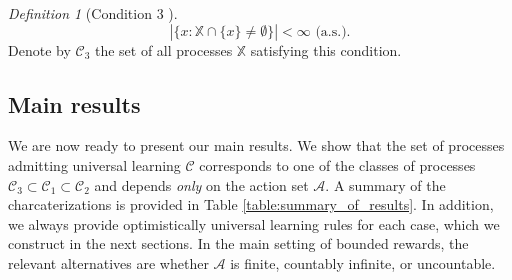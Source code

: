 \documentclass[aos]{imsart}
\theoremstyle{plain}
\theoremstyle{remark}
\newtheorem{definition}[theorem]{Definition}
\newcommand{\Acal}{\mathcal{A}}
\newcommand{\Ccal}{\mathcal{C}}
\newcommand{\1}{\mathbbm{1}}%
\newcommand{\ProcX}{\mathbb{X}}
\newcommand{\UKC}{\mathcal{C}_{3}}
\newcommand{\FS}{\UKC}
\begin{document}
\begin{definition}[Condition 3 \citep*{hanneke:21,blanchard:22b}]
  \label{con:fs}
  \begin{equation*} 
  |\{ x : \ProcX \cap \{x\} \neq \emptyset \}| < \infty \text{ (a.s.)}.
  \end{equation*}
  Denote by $\FS$ the set of all processes 
  $\ProcX$ satisfying this condition.
\end{definition}


\subsection{Main results}

We are now ready to present our main results. We show that the set of processes admitting universal learning $\Ccal$ corresponds to one of the classes of processes $\Ccal_3\subset\Ccal_1\subset\Ccal_2$ and depends \emph{only} on the action set $\Acal$. A summary of the charcaterizations is provided in Table \ref{table:summary_of_results}. In addition, we always provide optimistically universal learning rules for each case, which we construct in the next sections. In the main setting of bounded rewards, the relevant alternatives are whether $\Acal$ is finite, countably infinite, or uncountable.
\end{document}
